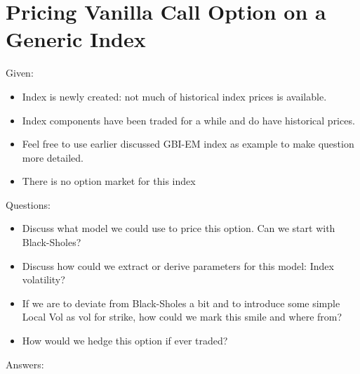 \documentclass[paper=a4, fontsize=10pt,]{scrartcl} %
\theoremstyle{theorem}
\theoremstyle{remark}
\theoremstyle{example}
\numberwithin{equation}{section} %
\numberwithin{figure}{section} %
\numberwithin{table}{section} %
\begin{document}
\section{Pricing Vanilla Call Option on a Generic Index}
Given:
\begin{itemize}
\item Index is newly created: not much of historical index prices is available.
\item Index components have been traded for a while and do have historical prices.
\item Feel free to use earlier discussed GBI-EM index as example to make
question more detailed.
\item There is no option market for this index
\end{itemize}
Questions:
\begin{itemize}
\item Discuss what model we could use to price this option. Can we start with
Black-Sholes?
\item Discuss how could we extract or derive parameters for this model: Index volatility?
\item If we are to deviate from Black-Sholes a bit and to introduce some simple
Local Vol as vol for strike, how could we mark this smile and where from?
\item How would we hedge this option if ever traded?
\end{itemize}
Answers:
\end{document}
